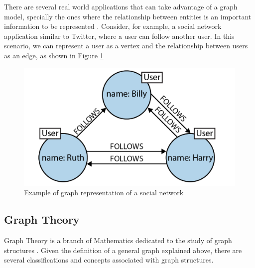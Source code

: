 There are several real world applications that can take advantage of a graph model, specially the ones where the relationship between entities is an important information to be represented \cite{Miller2013}. Consider, for example, a social network application similar to Twitter, where a user can follow another user. In this scenario, we can represent a user as a vertex and the relationship between users as an edge, as shown in Figure \ref{fig:figure5}

\begin{figure}[ht]
\centering
\includegraphics[width=.5\textwidth]{../social_network_graph_example.png}
\caption{Example of graph representation of a social network \cite{Miller2013}}
\label{fig:figure5}
\end{figure}

\subsection{Graph Theory}
Graph Theory is a branch of Mathematics dedicated to the study of graph structures \cite{Tobergte2013}. Given the definition of a general graph explained above, there are several classifications and concepts associated with graph structures.

